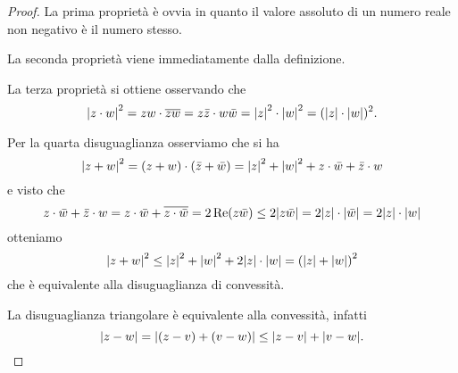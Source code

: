 \begin{proof}
La prima proprietà è ovvia in quanto il valore assoluto di un numero reale
non negativo è il numero stesso.

La seconda proprietà viene immediatamente dalla definizione.

La terza proprietà si ottiene osservando che 
\[
{\left|z\cdot w\right|}^2 
  = zw \cdot \overline{zw} 
  = z\bar z \cdot w\bar w = {\left|z\right|}^2 \cdot {\left|w\right|}^2 
  = ({\left|z\right|} \cdot {\left|w\right|})^2.
\]

Per la quarta disuguaglianza osserviamo che si ha
\[
  {\left|z+w\right|}^2 = (z+w)\cdot(\bar z + \bar w)
  = {\left|z\right|}^2 + {\left|w\right|}^2 + z\cdot \bar w + \bar z \cdot w
\]
e visto che
\[
  z\cdot \bar w + \bar z \cdot w
  = z \cdot \bar w + \overline{z \cdot \bar w}
  = 2 \operatorname{Re}(z\bar w)
  \le 2 {\left|z\bar w\right|}
  = 2 {\left|z\right|}\cdot{\left|\bar w\right|}
  = 2 {\left|z\right|}\cdot{\left|w\right|}
\]
otteniamo
\[
 {\left|z+w\right|}^2 \le {\left|z\right|}^2+{\left|w\right|}^2 + 2 {\left|z\right|}\cdot{\left|w\right|}
 ={\left( {\left|z\right|} + {\left|w\right|} \right)}^2
\]
che è equivalente alla disuguaglianza di convessità.

La disuguaglianza triangolare è equivalente alla convessità, infatti
\[
  {\left|z-w\right|} = {\left|(z-v) + (v-w)\right|}
  \le {\left|z-v\right|} + {\left|v-w\right|}.
\]
\end{proof}

